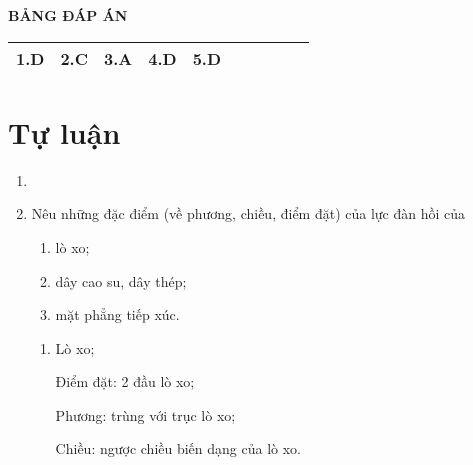 \whiteBGstarEnd

\loigiai
{
	\begin{center}
		\textbf{BẢNG ĐÁP ÁN}
	\end{center}
	\begin{center}
		\begin{tabular}{|m{2.8em}|m{2.8em}|m{2.8em}|m{2.8em}|m{2.8em}|m{2.8em}|m{2.8em}|m{2.8em}|m{2.8em}|m{2.8em}|}
			\hline
			1.D  & 2.C  & 3.A  & 4.D  & 5.D  &  & & &  &  \\
			\hline
			
		\end{tabular}
	\end{center}
}
\section{Tự luận}
\begin{enumerate}[label=\bfseries Câu \arabic*:]
	\item {}
	
	
	
	\item {}
	
	\cauhoi
	{Nêu những đặc điểm (về phương, chiều, điểm đặt) của lực đàn hồi của
		\begin{enumerate}
			\item lò xo;
			\item dây cao su, dây thép;
			\item mặt phẳng tiếp xúc.
		\end{enumerate}
	}
	
	\loigiai
	{\begin{enumerate}
			\item Lò xo;
			
			Điểm đặt: 2 đầu lò xo;
			
			Phương: trùng với trục lò xo;
			
			Chiều: ngược chiều biến dạng của lò xo.
			

\end{enumerate}}
\end{enumerate}
